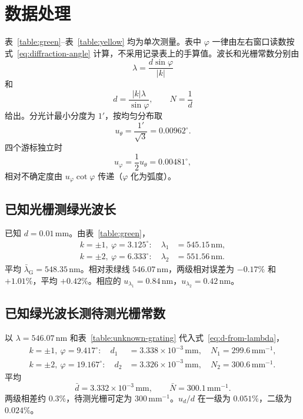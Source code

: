 \documentclass{../template/myrpt}
\begin{document}
\section{数据处理}

表~\ref{table:green}--表~\ref{table:yellow} 均为单次测量。表中 $\varphi$ 一律由左右窗口读数按式~\eqref{eq:diffraction-angle} 计算，不采用记录表上的手算值。波长和光栅常数分别由
\begin{equation}
  \label{eq:lambda-from-d}
  \lambda=\frac{d\sin\varphi}{\lvert k\rvert}
\end{equation}
和
\begin{equation}
  \label{eq:d-from-lambda}
  d=\frac{\lvert k\rvert\lambda}{\sin\varphi},\qquad N=\frac{1}{d}
\end{equation}
给出。分光计最小分度为 $1'$，按均匀分布取
\[
  u_\theta=\frac{1'}{\sqrt{3}}=0.00962^\circ.
\]
四个游标独立时
\begin{equation}
  \label{eq:phi-uncertainty}
  u_\varphi=\frac{1}{2}u_\theta=0.00481^\circ,
\end{equation}
相对不确定度由 $u_\varphi\cot\varphi$ 传递（$\varphi$ 化为弧度）。

\subsection{已知光栅测绿光波长}

已知 $d=0.01\,\si{\milli\metre}$。由表~\ref{table:green}，
\begin{align*}
  k=\pm1,\ \varphi=3.125^\circ:\quad
  \lambda_1
  &=545.15\,\si{\nano\metre},\\
  k=\pm2,\ \varphi=6.333^\circ:\quad
  \lambda_2
  &=551.56\,\si{\nano\metre}.
\end{align*}
平均 $\bar\lambda_{\mathrm{G}}=548.35\,\si{\nano\metre}$。相对汞绿线 $546.07\,\si{\nano\metre}$，两级相对误差为 $-0.17\%$ 和 $+1.01\%$，平均 $+0.42\%$。相应的 $u_{\lambda_1}=0.84\,\si{\nano\metre}$，$u_{\lambda_2}=0.42\,\si{\nano\metre}$。

\subsection{已知绿光波长测待测光栅常数}

以 $\lambda=546.07\,\si{\nano\metre}$ 和表~\ref{table:unknown-grating} 代入式~\eqref{eq:d-from-lambda}，
\begin{align*}
  k=\pm1,\ \varphi=9.417^\circ:\quad
  d_1&=3.338\times10^{-3}\,\si{\milli\metre},
  \quad N_1=299.6\,\mathrm{mm}^{-1},\\
  k=\pm2,\ \varphi=19.167^\circ:\quad
  d_2&=3.326\times10^{-3}\,\si{\milli\metre},
  \quad N_2=300.6\,\mathrm{mm}^{-1}.
\end{align*}
平均
\[
  \bar d=3.332\times10^{-3}\,\si{\milli\metre},\qquad
  \bar N=300.1\,\mathrm{mm}^{-1}.
\]
两级相差约 $0.3\%$，待测光栅可定为 $300\,\mathrm{mm}^{-1}$。$u_d/d$ 在一级为 $0.051\%$，二级为 $0.024\%$。
\end{document}
